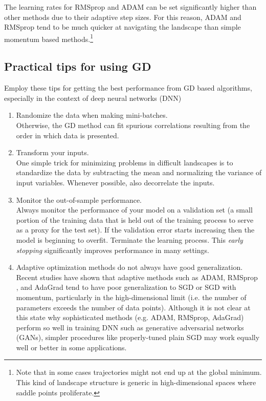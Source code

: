 The learning rates for RMSprop and ADAM can be set significantly higher than other methods due to their adaptive step sizes. For this reason, ADAM and RMSprop tend to be much quicker at navigating the landscape than simple momentum based methods.\footnote{Note that in some cases trajectories might not end up at the global minimum. This kind of landscape structure is generic in high-dimensional spaces where saddle points proliferate.}
\subsection{Practical tips for using GD}
Employ these tips for getting the best performance from GD based algorithms, especially in the context of deep neural networks (DNN)
\begin{enumerate}
	\item Randomize the data when making mini-batches.\\
	Otherwise, the GD method can fit spurious correlations resulting from the order in which data is presented.
	\item Transform your inputs.\\
	One simple trick for minimizing problems in difficult landscapes is to standardize the data by subtracting the mean and normalizing the variance of input variables. Whenever possible, also decorrelate the inputs. 
	\item Monitor the out-of-sample performance.\\
	Always monitor the performance of your model on a validation set (a small portion of the training data that is held out of the training process to serve as a proxy for the test set). If the validation error starts increasing then the model is beginning to overfit. Terminate the learning process. This \emph{early stopping} significantly improves performance in many settings.
	\item Adaptive optimization methods do not always have good generalization.\\
	Recent studies have shown that adaptive methods such as ADAM, RMSprop , and AdaGrad tend to have poor generalization to SGD or SGD with momentum, particularly in the high-dimensional limit (i.e. the number of parameters exceeds the number of data points). Although it is not clear at this state why sophisticated methods (e.g. ADAM, RMSprop, AdaGrad)  perform so well in training DNN such as generative adversarial networks (GANs), simpler procedures like properly-tuned plain SGD may work equally well or better in some applications.
\end{enumerate}




